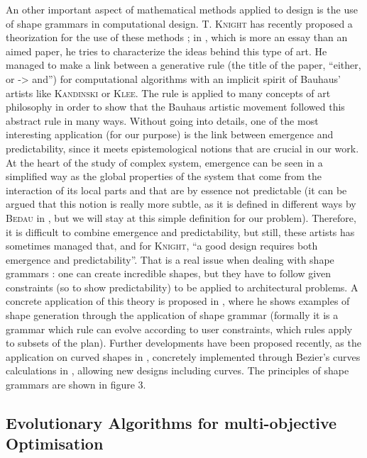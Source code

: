 \documentclass[english]{article}
\newcommand{\noun}[1]{\textsc{#1}}
\begin{document}
\bigskip{}


An other important aspect of mathematical methods applied to design
is the use of shape grammars in computational design. \noun{T. Knight}
has recently proposed a theorization for the use of these methods
; in \cite{knight2003either}, which is more an essay than an aimed
paper, he tries to characterize the ideas behind this type of art.
He managed to make a link between a generative rule (the title of
the paper, ``either, or -> and'') for computational algorithms with
an implicit spirit of Bauhaus' artists like \noun{Kandinski} or \noun{Klee}.
The rule is applied to many concepts of art philosophy in order to
show that the Bauhaus artistic movement followed this abstract rule
in many ways. Without going into details, one of the most interesting
application (for our purpose) is the link between emergence and predictability,
since it meets epistemological notions that are crucial in our work.
At the heart of the study of complex system, emergence can be seen
in a simplified way as the global properties of the system that come
from the interaction of its local parts and that are by essence not
predictable (it can be argued that this notion is really more subtle,
as it is defined in different ways by \noun{Bedau} in \cite{bedau2002downward},
but we will stay at this simple definition for our problem). Therefore,
it is difficult to combine emergence and predictability, but still,
these artists has sometimes managed that, and for \noun{Knight}, ``a
good design requires both emergence and predictability''. That is
a real issue when dealing with shape grammars : one can create incredible
shapes, but they have to follow given constraints (so to show predictability)
to be applied to architectural problems. A concrete application of
this theory is proposed in \cite{knight2003computing}, where he shows
examples of shape generation through the application of shape grammar
(formally it is a grammar which rule can evolve according to user
constraints, which rules apply to subsets of the plan). Further developments
have been proposed recently, as the application on curved shapes in
\cite{jowers2010construction}, concretely implemented through Bezier's
curves calculations in \cite{jowers2011implementation}, allowing
new designs including curves. The principles of shape grammars are
shown in figure 3.


\subsection{Evolutionary Algorithms for multi-objective Optimisation}
\end{document}
